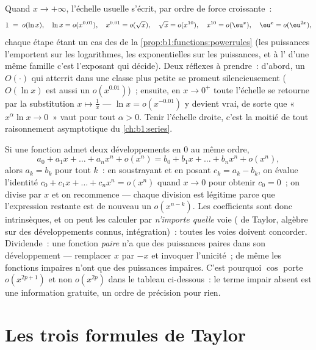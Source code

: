 \begin{example}\label{ex:b1:taylor:scale}
Quand $x \to +\infty$, l'échelle usuelle s'écrit, par ordre de
force croissante~:
\[
1 \;=\; o(\ln x), \quad
\ln x = o(x^{0.01}), \quad
x^{0.01} = o(\sqrt x), \quad
\sqrt x = o(x^{10}), \quad
x^{10} = o(\eu^{x}), \quad
\eu^x = o(\eu^{2x}) ,
\]
chaque étape étant un cas des  de la
\cref{prop:b1:functions:powerrules} (les puissances l'emportent sur
les logarithmes, les exponentielles sur les puissances, et à
l' d'une même famille c'est l'exposant qui décide). Deux
réflexes à prendre~: d'abord, un $O(\cdot)$ qui atterrit dans une
classe plus petite se promeut silencieusement ($O(\ln x)$ est aussi
un $o(x^{0.01})$)~; ensuite, en $x \to 0^+$ toute l'échelle se
retourne par la substitution $x \mapsto \frac1x$ ---
$\ln x = o(x^{-0.01})$ y devient vrai, de sorte que
«~$x^\alpha \ln x \to 0$~» vaut pour tout $\alpha > 0$. Tenir
l'échelle droite, c'est la moitié de tout raisonnement asymptotique
du \cref{ch:b1:series}.
\end{example}

\begin{example}\label{ex:b1:taylor:uniqueness}
Si une fonction admet deux développements en $0$ au même ordre,
\[
a_0 + a_1 x + \dots + a_n x^n + o(x^n)
= b_0 + b_1 x + \dots + b_n x^n + o(x^n),
\]
alors $a_k = b_k$ pour tout $k$~: en soustrayant et en posant $c_k =
a_k - b_k$, on évalue l'identité $c_0 + c_1 x + \dots + c_n x^n
= o(x^n)$ quand $x \to 0$ pour obtenir $c_0 = 0$~; on divise par $x$
et on recommence --- chaque division est légitime parce que
l'expression restante est de nouveau un $o(x^{n-k})$. Les
coefficients sont donc intrinsèques, et on peut les calculer par
\emph{n'importe quelle} voie ( de Taylor, algèbre sur des
développements connus, intégration)~: toutes les voies doivent
concorder. Dividende~: une fonction \emph{paire} n'a que des
puissances paires dans son développement --- remplacer $x$ par $-x$
et invoquer l'unicité~; de même les fonctions impaires n'ont que des
puissances impaires. C'est pourquoi $\cos$ porte $o(x^{2p+1})$ et
non $o(x^{2p})$ dans le tableau ci-dessous~: le terme impair absent
est une information gratuite, un ordre de précision pour rien.
\end{example}

\section{Les trois formules de Taylor}

